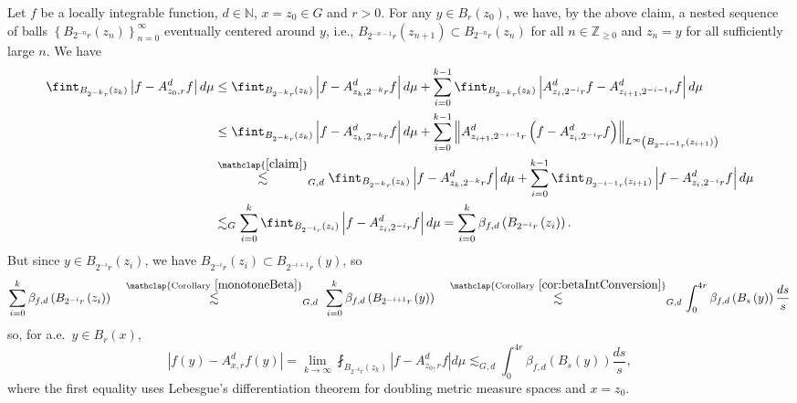 \documentclass[11pt,reqno]{amsart}
\newcommand{\1}{\mathbf 1}
\begin{document}
Let $f$ be a locally integrable function, $d\in \mathbb{N}$, $x=z_0\in G$ and $r>0$. For any $y\in B_r\left(z_0\right)$, we have, by the above claim, a nested sequence of balls $\left\{B_{2^{-n}r}\left(z_n\right)\right\}_{n=0}^\infty$ eventually centered around $y$, i.e., $B_{2^{-n-1}r}\left(z_{n+1}\right)\subset B_{2^{-n}r}\left(z_{n}\right)$ for all $n\in \mathbb{Z}_{\ge 0}$ and $z_n=y$ for all sufficiently large $n$. We have
\begin{align*}
\fint_{B_{2^{-k}r}\left(z_k\right)}\left|f-A_{z_0,r}^df\right|d\mu&\le \fint_{B_{2^{-k}r}\left(z_k\right)}\left|f-A_{z_k,2^{-k}r}^d f\right|d\mu+\sum_{i=0}^{k-1}\fint_{B_{2^{-k}r}\left(z_k\right)}\left|A_{z_i,2^{-i}r}^df-A_{z_{i+1},2^{-i-1}r}^df\right|d\mu\\
&\le \fint_{B_{2^{-k}r}\left(z_k\right)}\left|f-A_{z_k,2^{-k}r}^d f\right|d\mu+\sum_{i=0}^{k-1}\left\|A_{z_{i+1},2^{-i-1}r}^d\left(f-A_{z_i,2^{-i}r}^df\right)\right\|_{L^\infty\left(B_{2^{-i-1}r}\left(z_{i+1}\right)\right)}\\
&\stackrel{\mathclap{\eqref{claim}}}{\lesssim}_{G,d}\fint_{B_{2^{-k}r}\left(z_k\right)}\left|f-A_{z_k,2^{-k}r}^d f\right|d\mu+\sum_{i=0}^{k-1}\fint_{B_{2^{-i-1}r}\left(z_{i+1}\right)}\left|f-A_{z_i,2^{-i}r}^df\right|d\mu\\
&\lesssim_G \sum_{i=0}^k \fint_{B_{2^{-i}r}\left(z_i\right)}\left|f-A^d_{z_i,2^{-i}r}f\right|d\mu=\sum_{i=0}^k \beta_{f,d}\left(B_{2^{-i}r}\left(z_i\right)\right).
\end{align*}
But since $y\in B_{2^{-i}r}\left(z_i\right)$, we have $B_{2^{-i}r}\left(z_i\right)\subset B_{2^{-i+1}r}\left(y\right)$, so
\[
\sum_{i=0}^k \beta_{f,d}\left(B_{2^{-i}r}\left(z_i\right)\right)\quad\stackrel{\mathclap{\mathrm{Corollary~}\ref{monotoneBeta}}}{\lesssim}_{G,d}~\sum_{i=0}^k \beta_{f,d}\left(B_{2^{-i+1}r}\left(y\right)\right)\quad\stackrel{\mathclap{\mathrm{Corollary~}\ref{cor:betaIntConversion}}}{\lesssim}_{G,d} \int_0^{4r}\beta_{f,d}\left(B_s\left(y\right)\right)\frac{ds}{s}
\]
so, for a.e.~$y\in B_r\left(x\right)$,
\begin{equation}\label{eq:localize-beta}
\left|f\left(y\right)-A_{x,r}^df\left(y\right)\right|=\lim_{k\to\infty}\fint_{B_{2^{-k}r}\left(z_k\right)}\left|f-A_{z_0,r}^df\right|d\mu\lesssim_{G,d} \int_0^{4r}\beta_{f,d}\left(B_s\left(y\right)\right)\frac{ds}{s},
\end{equation}
where the first equality uses Lebesgue's differentiation theorem for doubling metric measure spaces and $x=z_0$.
\end{document}
